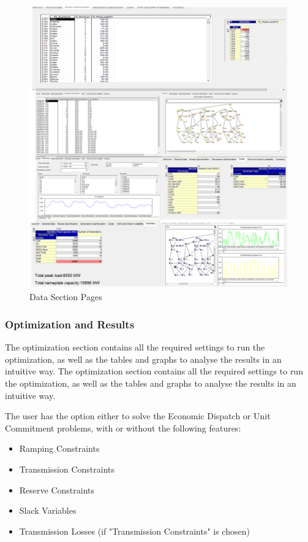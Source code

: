 \documentclass[12pt,LUDisStyle,twosided]{book}
\begin{document}
\begin{figure}[H] 
	\begin{center}
		\includegraphics[width=\textwidth,height=\textheight,keepaspectratio]{aimmsDataPages.png}
	  	\caption{Data Section Pages}
     	\label{fig:dataSectionPages}
	\end{center}
\end{figure}


\subsubsection{Optimization and Results}

The optimization section contains all the required settings to run the optimization, as well as the tables and graphs to analyse the results in an intuitive way. 
The optimization section contains all the required settings to run the optimization, as well as the tables and graphs to analyse the results in an intuitive way. 

The user has the option either to solve the Economic Dispatch or Unit Commitment problems, with or without the following features:

\begin{itemize}
\item Ramping Constraints
\item Transmission Constraints
\item Reserve Constraints
\item Slack Variables
\item Transmission Losses (if "Transmission Constraints" is chosen)
\end{itemize}
\end{document}
